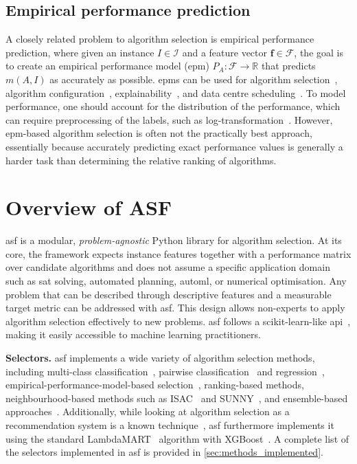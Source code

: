 \subsection{Empirical performance prediction}
A closely related problem to algorithm selection is empirical performance prediction, where given an instance $I\in\mathcal{I}$ and a feature vector $\mathbf{f}\in\mathcal{F}$, the goal is to create an empirical performance model (\gls{epm}) $P_A:\mathcal{F}\rightarrow \mathbb{R}$ that predicts $m(A, I)$ as accurately as possible.
\Glspl{epm} can be used for algorithm selection~\citep{NudEtAl04,XuEtAl08}, algorithm configuration~\citep{HutEtAl11,LinEtAl22}, explainability~\citep{HutEtAl13}, and data centre scheduling~\citep{LeeEtAl25}.
To model performance, one should account for the distribution of the performance, which can require preprocessing of the labels, such as log-transformation~\citep{HutEtAl14}. However, \gls{epm}-based algorithm selection is often not the practically best approach, essentially because accurately predicting exact performance values is generally a harder task than determining the relative ranking of algorithms.

\section{Overview of ASF}
\label{sec:asf_overview}
\Gls{asf} is a modular, \emph{problem-agnostic} Python library for algorithm selection.
At its core, the framework expects instance features together with a performance matrix over candidate algorithms and does not assume a specific application domain such as \gls{sat} solving, automated planning, \gls{automl}, or numerical optimisation.
Any problem that can be described through descriptive features and a measurable target metric can be addressed with \gls{asf}.
This design allows non-experts to apply algorithm selection effectively to new problems.
\Gls{asf} follows a scikit-learn-like \gls{api}~\citep{PedEtAl11}, making it easily accessible to machine learning practitioners.

\textbf{Selectors.}
\Gls{asf} implements a wide variety of algorithm selection methods, including multi-class classification~\citep{Kotthoff13}, pairwise classification~\citep{XuEtAl12} and regression~\citep{KerEtAl18}, empirical-performance-model-based selection~\citep{XuEtAl08}, ranking-based methods, neighbourhood-based methods such as ISAC~\citep{KadEtAl10} and SUNNY~\citep{AmaEtAl14}, and ensemble-based approaches~\citep{TorEtAl23}. Additionally, while looking at algorithm selection as a recommendation system is a known technique~\citep{MisEtAl17}, \gls{asf} furthermore implements it using the standard LambdaMART~\citep{Burges10} algorithm with XGBoost~\citep{CheGue16}.
A complete list of the selectors implemented in \gls{asf} is provided in \autoref{sec:methods_implemented}.


